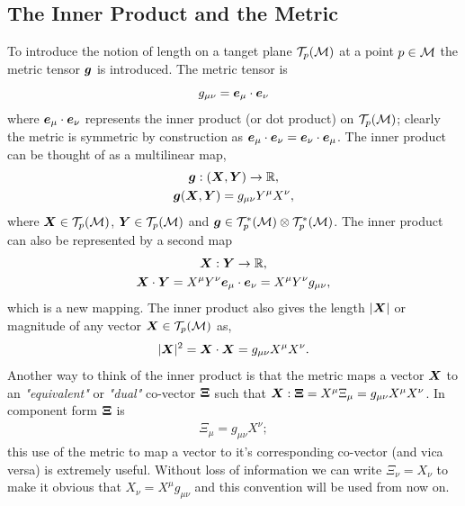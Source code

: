 \subsection{The Inner Product and the Metric} \label{intro:sec:dotprod}
To introduce the notion of length on a tanget plane $\mathcal{T}_p(\mathcal{M})$ at a point $p\in\mathcal{M}$ the metric tensor $\boldsymbol{g}$ is introduced. The metric tensor is 
\begin{equation}
g_{\mu\nu} = \boldsymbol{e}_\mu \cdot \boldsymbol{e}_\nu
\end{equation}
where $\boldsymbol{e}_\mu \cdot \boldsymbol{e}_\nu$ represents the inner product (or dot product) on $\mathcal{T}_p(\mathcal{M})$; clearly the metric is symmetric by construction as $\boldsymbol{e}_\mu \cdot \boldsymbol{e}_\nu=\boldsymbol{e}_\nu \cdot \boldsymbol{e}_\mu$. The inner product can be thought of as a multilinear map,
\begin{gather}
\boldsymbol{g} : (\boldsymbol{X} , \boldsymbol{Y}) \rightarrow \mathbb{R} ,\\
\boldsymbol{g}(\boldsymbol{X},\boldsymbol{Y}) = g_{\mu\nu} Y^\mu X^\nu,
\end{gather}
where $\boldsymbol{X}\in \mathcal{T}_p(\mathcal{M})$, $\boldsymbol{Y}\in \mathcal{T}_p(\mathcal{M})$ and $\boldsymbol{g}\in \mathcal{T}^*_p(\mathcal{M})\otimes  \mathcal{T}^*_p(\mathcal{M})$. The inner product can also be represented by a second map
\begin{gather}
\boldsymbol{X} : \boldsymbol{Y} \rightarrow \mathbb{R} ,\\
\boldsymbol{X} \cdot \boldsymbol{Y} = X^\mu Y^\nu \boldsymbol{e}_\mu \cdot \boldsymbol{e}_\nu = X^\mu Y^\nu g_{\mu\nu},
\end{gather}
which is a new mapping. The inner product also gives the length $|\boldsymbol{X}|$ or magnitude of any vector $\boldsymbol{X}\in \mathcal{T}_p(\mathcal{M})$ as,
\begin{equation}
|\boldsymbol{X}|^2 = \boldsymbol{X} \cdot \boldsymbol{X} = g_{\mu\nu}X^\mu X^\nu.
\end{equation}
Another way to think of the inner product is that the metric maps a vector $\boldsymbol{X}$ to an {\it "equivalent"} or {\it "dual"} co-vector $\boldsymbol{\Xi}$ such that $\boldsymbol{X} : \boldsymbol{\Xi} = X^\mu \Xi_\mu= g_{\mu\nu}X^\mu X^\nu$. In component form $\boldsymbol{\Xi}$ is
\begin{align}
\Xi_\mu = g_{\mu\nu}X^\nu;
\end{align}
this use of the metric to map a vector to it's corresponding co-vector (and vica versa) is extremely useful. Without loss of information we can write $\Xi_\nu = X_\nu$ to make it obvious that $X_\nu = X^\mu g_{\mu\nu}$ and this convention will be used from now on.

